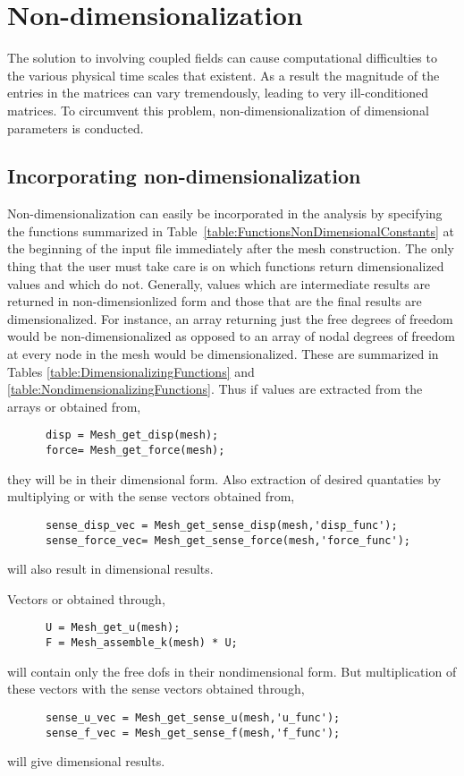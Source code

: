 \clearpage
\section{Non-dimensionalization}
The solution to involving coupled fields can
cause computational difficulties to the various
physical time scales that existent. As a result
the magnitude of the entries in the matrices can
vary tremendously, leading to very ill-conditioned
matrices. To circumvent this problem, non-dimensionalization
of dimensional parameters is conducted. 

\subsection{Incorporating non-dimensionalization}
Non-dimensionalization can easily be incorporated in the
analysis by specifying the functions summarized in 
Table~\ref{table:FunctionsNonDimensionalConstants}
at the beginning of the input file immediately
after the mesh construction. The only thing that the
user must take care is on which functions return 
dimensionalized values and which do not. Generally,
values which are intermediate results are returned in
non-dimensionlized form and those that are the final
results are dimensionalized. For instance, an array
returning just the free degrees of freedom would be 
non-dimensionalized as opposed to an array of nodal 
degrees of freedom at every node in the mesh would be 
dimensionalized.  
These are summarized in Tables 
\ref{table:DimensionalizingFunctions} and
\ref{table:NondimensionalizingFunctions}.
Thus if values are extracted from the arrays 
or  obtained from,
\begin{verbatim}
      disp = Mesh_get_disp(mesh);
      force= Mesh_get_force(mesh);
\end{verbatim}
they will be in their dimensional form. Also extraction
of desired quantaties by multiplying  or 
with the sense vectors obtained from,
\begin{verbatim}
      sense_disp_vec = Mesh_get_sense_disp(mesh,'disp_func');
      sense_force_vec= Mesh_get_sense_force(mesh,'force_func');
\end{verbatim}
will also result in dimensional results.

Vectors  or  obtained through,
\begin{verbatim}
      U = Mesh_get_u(mesh);
      F = Mesh_assemble_k(mesh) * U;
\end{verbatim}
will contain only the free dofs in their nondimensional form.
But multiplication of these vectors with the sense vectors
obtained through,
\begin{verbatim}
      sense_u_vec = Mesh_get_sense_u(mesh,'u_func');
      sense_f_vec = Mesh_get_sense_f(mesh,'f_func');
\end{verbatim}
will give dimensional results. 

